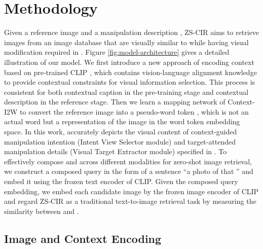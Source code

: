 \documentclass[letterpaper]{article} \usepackage{aaai24}  \usepackage{times}  \usepackage{helvet}  \usepackage{courier}  \usepackage[hyphens]{url}  \usepackage{graphicx} \urlstyle{rm} \def\UrlFont{\rm}  \usepackage{natbib}  \usepackage{caption} \frenchspacing  \setlength{\pdfpagewidth}{8.5in} \setlength{\pdfpageheight}{11in} \usepackage{algorithm}
\begin{document}
\section{Methodology}

Given a reference image  and a manipulation description , ZS-CIR aims to retrieve images from an image database that are visually similar to  while having visual modification required in . Figure \ref{fig:model-architecture} gives a detailed illustration of our model. We first introduce a new approach of encoding context based on pre-trained CLIP \cite{radford2021learning}, which contains vision-language alignment knowledge to provide contextual constraints for visual information selection. This process is consistent for both contextual caption in the pre-training stage and contextual description in the reference stage. Then we learn a mapping network of Context-I2W to convert the reference image  into a pseudo-word token , which is not an actual word but a representation of the image in the word token embedding space. In this work,  accurately depicts the visual content of context-guided manipulation intention (Intent View Selector module) and target-attended manipulation details (Visual Target Extractor module) specified in . To effectively compose   and  across different modalities for zero-shot image retrieval, we construct a composed query in the form of a sentence  ``a photo of  that {}” and embed it using the frozen text encoder of CLIP. Given the composed query embedding, we embed each candidate image  by the frozen image encoder of CLIP and regard ZS-CIR as a traditional text-to-image retrieval task by measuring the similarity between  and .

\subsection{Image and Context Encoding}
\end{document}
